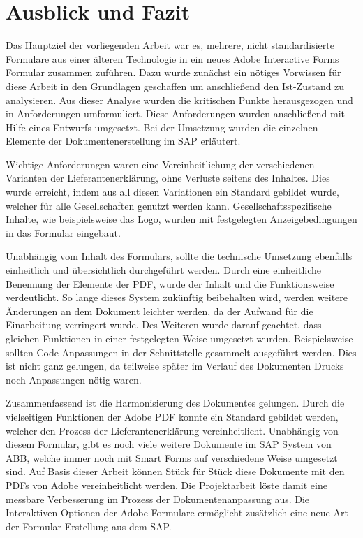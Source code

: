 \chapter{Ausblick und Fazit}
\label{ch:Ausblick}

Das Hauptziel der vorliegenden Arbeit war es, mehrere, nicht standardisierte Formulare aus einer älteren Technologie in ein neues Adobe Interactive Forms Formular zusammen zuführen. Dazu wurde zunächst ein nötiges Vorwissen für diese Arbeit in den Grundlagen geschaffen um anschließend den Ist-Zustand zu analysieren. Aus dieser Analyse wurden die kritischen Punkte herausgezogen und in Anforderungen umformuliert. Diese Anforderungen wurden anschließend mit Hilfe eines Entwurfs umgesetzt. Bei der Umsetzung wurden die einzelnen Elemente der Dokumentenerstellung im SAP erläutert.

Wichtige Anforderungen waren eine Vereinheitlichung der verschiedenen Varianten der Lieferantenerklärung, ohne Verluste seitens des Inhaltes. Dies wurde erreicht, indem aus all diesen Variationen ein Standard gebildet wurde, welcher für alle Gesellschaften genutzt werden kann. Gesellschaftsspezifische Inhalte, wie beispielsweise das Logo, wurden mit festgelegten Anzeigebedingungen in das Formular eingebaut.

Unabhängig vom Inhalt des Formulars, sollte die technische Umsetzung ebenfalls einheitlich und übersichtlich durchgeführt werden. Durch eine einheitliche Benennung der Elemente der \ac{PDF}, wurde der Inhalt und die Funktionsweise verdeutlicht. So lange dieses System zukünftig beibehalten wird, werden weitere Änderungen an dem Dokument leichter werden, da der Aufwand für die Einarbeitung verringert wurde. Des Weiteren wurde darauf geachtet, dass gleichen Funktionen in einer festgelegten Weise umgesetzt wurden. Beispielsweise sollten Code-Anpassungen in der Schnittstelle gesammelt ausgeführt werden. Dies ist nicht ganz gelungen, da teilweise später im Verlauf des Dokumenten Drucks noch Anpassungen nötig waren.

Zusammenfassend ist die Harmonisierung des Dokumentes gelungen. Durch die vielseitigen Funktionen der Adobe \ac{PDF} konnte ein Standard gebildet werden, welcher den Prozess der Lieferantenerklärung vereinheitlicht. Unabhängig von diesem Formular, gibt es noch viele weitere Dokumente im SAP System von ABB, welche immer noch mit Smart Forms auf verschiedene Weise umgesetzt sind. Auf Basis dieser Arbeit können Stück für Stück diese Dokumente mit den \ac{PDF}s von Adobe vereinheitlicht werden. Die Projektarbeit löste damit eine messbare Verbesserung im Prozess der Dokumentenanpassung aus. Die Interaktiven Optionen der Adobe Formulare ermöglicht zusätzlich eine neue Art der Formular Erstellung aus dem SAP.

 
